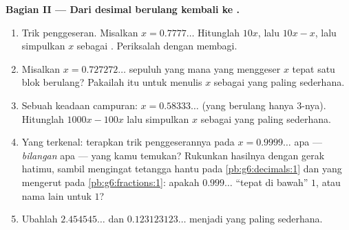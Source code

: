 \begin{problem}
\medskip
\noindent\textbf{Bagian II --- Dari desimal berulang kembali ke
.}
\begin{enumerate}[resume]
  \item Trik penggeseran. Misalkan $x = 0.7777\ldots$ Hitunglah $10x$,
        lalu $10x - x$, lalu simpulkan $x$ sebagai .
        Periksalah dengan membagi.
  \item Misalkan $x = 0.727272\ldots$  sepuluh yang mana yang
        menggeser $x$ tepat satu blok berulang? Pakailah itu untuk
        menulis $x$ sebagai  yang paling sederhana.
  \item Sebuah keadaan campuran: $x = 0.58333\ldots$ (yang berulang
        hanya $3$-nya). Hitunglah $1000x - 100x$ lalu simpulkan $x$
        sebagai  yang paling sederhana.
  \item Yang terkenal: terapkan trik penggeserannya pada
        $x = 0.9999\ldots$  apa --- \emph{bilangan} apa ---
        yang kamu temukan? Rukunkan hasilnya dengan
        gerak hatimu, sambil mengingat tetangga hantu pada
        \cref{pb:g6:decimals:1} dan  yang mengerut pada
        \cref{pb:g6:fractions:1}: apakah $0.999\ldots$ ``tepat di
        bawah'' $1$, atau nama lain untuk $1$?
  \item Ubahlah $2.454545\ldots$ dan $0.123123123\ldots$ menjadi
         yang paling sederhana.
\end{enumerate}


\end{problem}
